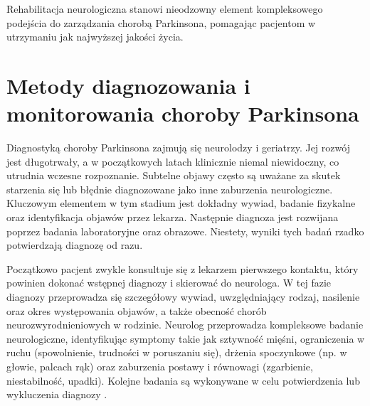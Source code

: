 Rehabilitacja neurologiczna stanowi nieodzowny element kompleksowego podejścia do zarządzania chorobą Parkinsona, pomagając pacjentom w utrzymaniu jak najwyższej jakości życia.


\section{Metody diagnozowania i monitorowania choroby Parkinsona}
\label{subsec:diagnostyka}

Diagnostyką choroby Parkinsona zajmują się neurolodzy i geriatrzy.
Jej rozwój jest długotrwały, a w początkowych latach klinicznie niemal niewidoczny, co utrudnia wczesne rozpoznanie.
Subtelne objawy często są uważane za skutek starzenia się lub błędnie diagnozowane jako inne zaburzenia neurologiczne.
Kluczowym elementem w tym stadium jest dokładny wywiad, badanie fizykalne oraz identyfikacja objawów przez lekarza.
Następnie diagnoza jest rozwijana poprzez badania laboratoryjne  oraz obrazowe.
Niestety, wyniki tych badań rzadko potwierdzają diagnozę od razu.

Początkowo pacjent zwykle konsultuje się z lekarzem pierwszego kontaktu, który powinien dokonać wstępnej diagnozy i skierować do neurologa.
W tej fazie diagnozy przeprowadza się szczegółowy wywiad, uwzględniający rodzaj, nasilenie oraz okres występowania objawów, a także
obecność chorób neurozwyrodnieniowych w rodzinie.
Neurolog przeprowadza kompleksowe badanie neurologiczne, identyfikując symptomy takie jak sztywność mięśni, ograniczenia w
ruchu (spowolnienie, trudności w poruszaniu się), drżenia spoczynkowe (np. w głowie, palcach rąk) oraz zaburzenia postawy i równowagi
(zgarbienie, niestabilność, upadki). Kolejne badania są wykonywane w celu potwierdzenia lub wykluczenia diagnozy \cite{diagnostyka_Sitek, Loscalzo_2022}.

